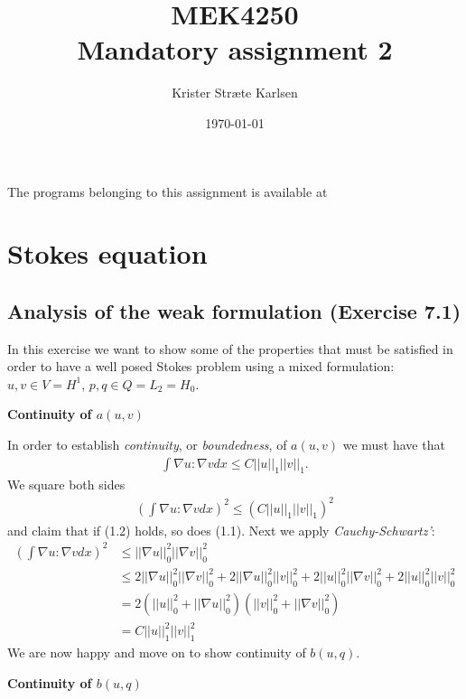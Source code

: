 \documentclass[11pt,a4paper,english]{article}
\title{MEK4250\\Mandatory assignment 2}
\author{Krister Stræte Karlsen}
\date{\today}
\numberwithin{equation}{section}
\begin{document}
\maketitle

The programs belonging to this assignment is available at \\
\texttt{\color{red}{https://github.com/krikarls/MEK4250}}

\section{Stokes equation}

\subsection{Analysis of the weak formulation (Exercise 7.1)}

In this exercise we want to show some of the properties that must be satisfied in order to have a well posed Stokes problem using a mixed formulation: $u,v \in V = H^1$, $p,q \in Q = L_2 = H_0$.

\textbf{Continuity of $a(u,v)$}

In order to establish \emph{continuity}, or \emph{boundedness}, of $a(u,v)$ we must have that 
\begin{align}
\int \nabla u : \nabla v dx \leq C||u||_1 ||v||_1.
\end{align}
We square both sides
\begin{align}
\left( \int \nabla u : \nabla v dx \right)^2 \leq \left( C||u||_1 ||v||_1 \right)^2
\end{align}
and claim that if (1.2) holds, so does (1.1). Next we apply \emph{Cauchy-Schwartz'}: 
\begin{align*}
\left( \int \nabla u : \nabla v dx \right)^2 &\leq ||\nabla u||_0^2 ||\nabla v||_0^2 \\
&\leq 2||\nabla u||_0^2 ||\nabla v||_0^2 + 2||\nabla u||_0^2 ||v||_0^2 + 2||u||_0^2 ||\nabla v||_0^2 +2||u||_0^2 ||v||_0^2 \\
&= 2 \left( ||u||_0^2 + ||\nabla u||_0^2  \right) \left( ||v||_0^2 + ||\nabla v||_0^2  \right) \\
&= C ||u||_1^2 ||v||_1^2
\end{align*} 
We are now happy and move on to show continuity of $b(u,q)$.

\newpage

\textbf{Continuity of $b(u,q)$}
\end{document}

